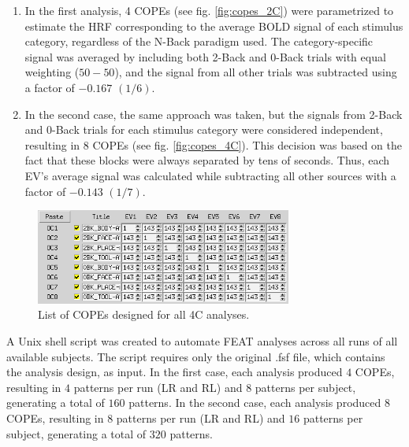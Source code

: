 \begin{enumerate}[label=\Roman*.]

\item In the first analysis, 4 \gls{COPE}s (see fig. \autoref{fig:copes_2C}) were parametrized to estimate the \gls{HRF} corresponding to the average \gls{BOLD} signal of each stimulus category, regardless of the N-Back paradigm used. The category-specific signal was averaged by including both 2-Back and 0-Back trials with equal weighting ($ 50 - 50 $), and the signal from all other trials was subtracted using a factor of $ -0.167$ $(1/6)$.

\item In the second case, the same approach was taken, but the signals from 2-Back and 0-Back trials for each stimulus category were considered independent, resulting in 8 \gls{COPE}s (see fig. \autoref{fig:copes_4C}). This decision was based on the fact that these blocks were always separated by tens of seconds. Thus, each \gls{EV}'s average signal was calculated while subtracting all other sources with a factor of $ -0.143$ $(1/7)$.

\end{enumerate}

\begin{figure}[htbp]
    \centering
    \includegraphics[width = 0.75\textwidth]{assets/images/COPEs_4C.png}
    \caption[]{List of \gls{COPE}s designed for all \gls{4C} analyses.}
    \label{fig:copes_4C}
\end{figure}

\addtocounter{table}{1}
\addtocounter{figure}{-1}

A Unix shell script was created to automate \acrshort{FEAT} analyses across all runs of all available subjects. The script requires only the original .fsf file, which contains the analysis design, as input. In the first case, each analysis produced $4$ \gls{COPE}s, resulting in $4$ patterns per run (\gls{LR} and \gls{RL}) and $8$ patterns per subject, generating a total of $160$ patterns. In the second case, each analysis produced $8$ \gls{COPE}s, resulting in $8$ patterns per run (\gls{LR} and \gls{RL}) and $16$ patterns per subject, generating a total of $320$ patterns.

